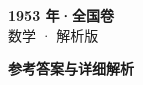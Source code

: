 \documentclass[zihao=-4, a4paper]{ctexart}
\begin{document}
\begin{center}
  {\Large\bfseries 1953 年·全国卷}\\[4pt]
  {\large 数学 · 解析版}
\end{center}
\medskip
{}

\clearpage
{}
\begin{center}{\Large\bfseries 参考答案与详细解析}\end{center}
\medskip

\end{document}

